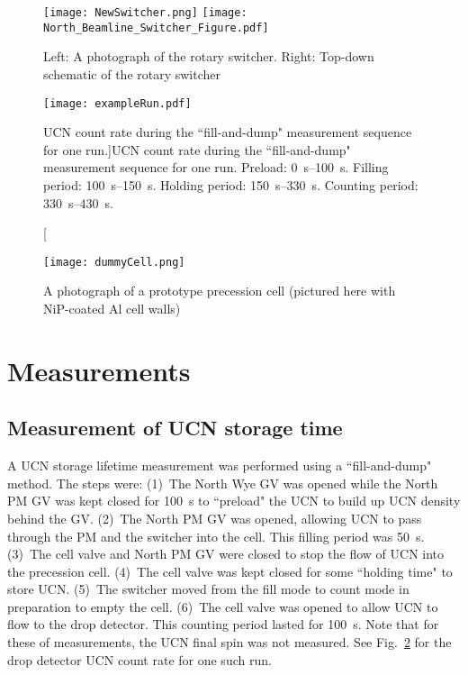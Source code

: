 \begin{figure}[htp]
    \centering
    \texttt{[image: NewSwitcher.png]}
    \hspace{1em}
    \texttt{[image: North\_Beamline\_Switcher\_Figure.pdf]}
    \caption[Photograph and schematic of rotary switcher]{Left: A photograph of the rotary switcher. Right: Top-down schematic of the rotary switcher}\label{fig:NewSwitcher}
\end{figure}


\begin{figure}[htp]
    \centering
    \texttt{[image: exampleRun.pdf]}
    \caption[UCN count rate during the ``fill-and-dump" measurement sequence for one run.]{UCN count rate during the ``fill-and-dump" measurement sequence for one run. Preload: \qtyrange{0}{100}{\s}. Filling period: \qtyrange{100}{150}{\s}. Holding period: \qtyrange{150}{330}{\s}. Counting period: \qtyrange{330}{430}{\s}.}
    \label{fig:timeSpectrum}
\end{figure}

\begin{figure}[htp]
    \centering
    \texttt{[image: dummyCell.png]}
    \caption[A photograph of a prototype precession cell]{A photograph of a prototype precession cell (pictured here with NiP-coated Al cell walls)}
    \label{fig:dummyCell}
\end{figure}


\section{\label{sec:measurement}Measurements}

\subsection{\label{subsec:holdingTimeMeasurement}Measurement of UCN storage time}


A UCN storage lifetime measurement was performed using a ``fill-and-dump" method. The steps were: (1)~The North Wye GV was opened while the North PM GV was kept closed for \qty{100}{\s} to ``preload" the UCN to build up UCN density behind the GV. (2)~The North PM GV was opened, allowing UCN to pass through the PM and the switcher into the cell. This filling period was \qty{50}{\s}. (3)~The cell valve and North PM GV were closed to stop the flow of UCN into the precession cell. (4)~The cell valve was kept closed for some ``holding time" to store UCN. (5)~The switcher moved from the fill mode to count mode in preparation to empty the cell. (6)~The cell valve was opened to allow UCN to flow to the drop detector. This counting period lasted for \qty{100}{\s}. Note that for these of measurements, the UCN final spin was not measured. See Fig.~\ref{fig:timeSpectrum} for the drop detector UCN count rate for one such run.

